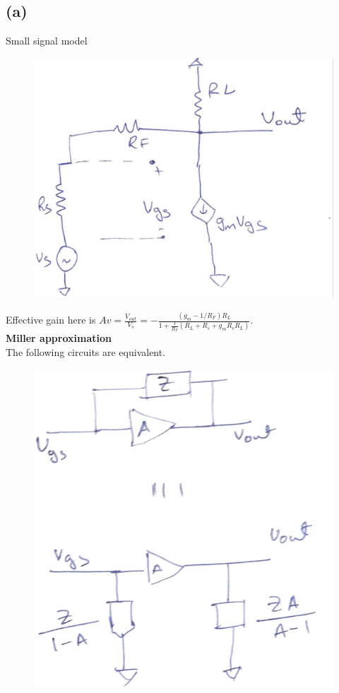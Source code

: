 \documentclass{article}
\begin{document}
\subsection*{(a)}
Small signal model\\
\begin{figure}[H]
	\centering
	\includegraphics[scale=0.2]{./figs/3e.jpeg}
\end{figure}
Effective gain here is $Av = \frac{V_{out}}{V_s} = -\frac{(g_m - 1/R_F)R_L}{1 + \frac{1}{R_F}(R_L + R_s + g_mR_sR_L)}$.\\
\textbf{Miller approximation}\\
The following circuits are equivalent.
\begin{figure}[H]
	\centering
	\includegraphics[scale=0.4]{./figs/3a.png}
\end{figure}
\end{document}
